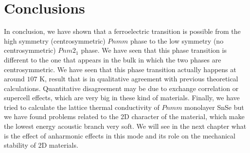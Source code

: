 \section{Conclusions}

In conclusion, we have shown that a ferroelectric transition is possible from the high symmetry (centrosymmetric) 
$Pnmm$ phase to the low symmetry (no centrosymmetric) $Pnm2_{1}$ phase. We have seen that this phase transition 
is different to the one that appears in the bulk in which the two phases are centrosymmetric. We have seen that 
this phase transition actually happens at around $107$ K, result that is in qualitative agreement with previous 
theoretical calculations. Quantitative disagreement may be due to exchange correlation or supercell effects, which 
are very big in these kind of materials. Finally, we have tried to calculate the lattice thermal conductivity of 
$Pnmm$ monolayer SnSe but we have found problems related to the 2D character of the material, which make the lowest 
energy acoustic branch very soft. We will see in the next chapter what is the effect of anharmonic effects in this 
mode and its role on the mechanical stability of 2D materials.
